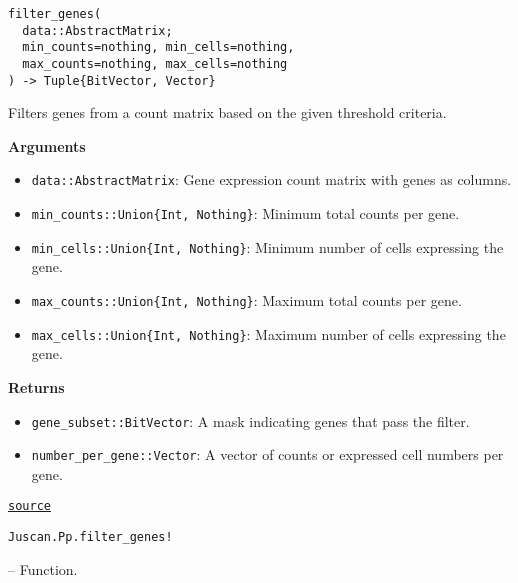 \documentclass[oneside]{memoir}
\begin{document}
\begin{adjustwidth}{2em}{0pt}
\begin{verbatim}
filter_genes(
  data::AbstractMatrix;
  min_counts=nothing, min_cells=nothing,
  max_counts=nothing, max_cells=nothing
) -> Tuple{BitVector, Vector}
\end{verbatim}

Filters genes from a count matrix based on the given threshold criteria.

\textbf{Arguments}

\begin{itemize}
\item \texttt{data::AbstractMatrix}: Gene expression count matrix with genes as columns.


\item \texttt{min\_counts::Union\{Int, Nothing\}}: Minimum total counts per gene.


\item \texttt{min\_cells::Union\{Int, Nothing\}}: Minimum number of cells expressing the gene.


\item \texttt{max\_counts::Union\{Int, Nothing\}}: Maximum total counts per gene.


\item \texttt{max\_cells::Union\{Int, Nothing\}}: Maximum number of cells expressing the gene.

\end{itemize}
\textbf{Returns}

\begin{itemize}
\item \texttt{gene\_subset::BitVector}: A mask indicating genes that pass the filter.


\item \texttt{number\_per\_gene::Vector}: A vector of counts or expressed cell numbers per gene.

\end{itemize}


\href{https://github.com/zehua0417/Juscan.jl/blob/393ad1b827b678ea98a738f92af658ee9ed9a403/src/preprocessing/filter.jl#L259-L278}{\texttt{source}}


\end{adjustwidth}
\hypertarget{9061421341658437259}{\texttt{Juscan.Pp.filter\_genes!}}  -- {Function.}
\end{document}
